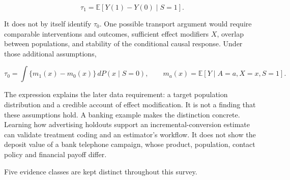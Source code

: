 \[
\tau_1=\mathbb E[Y(1)-Y(0)\mid S=1].
\]

It does not by itself identify \(\tau_0\). One possible transport
argument would require comparable interventions and outcomes, sufficient
effect modifiers \(X\), overlap between populations, and stability of
the conditional causal response. Under those additional assumptions,

\[
\tau_0=\int\{m_1(x)-m_0(x)\}\,dP(x\mid S=0),
\qquad m_a(x)=\mathbb E[Y\mid A=a,X=x,S=1].
\]

The expression explains the later data requirement: a target population
distribution and a credible account of effect modification. It is not a
finding that these assumptions hold. A banking example makes the
distinction concrete. Learning how advertising holdouts support an
incremental-conversion estimate can validate treatment coding and an
estimator's workflow. It does not show the deposit value of a bank
telephone campaign, whose product, population, contact policy and
financial payoff differ.

Five evidence classes are kept distinct throughout this survey.

